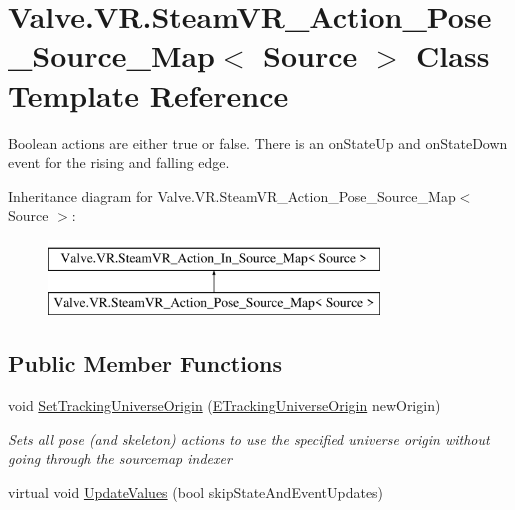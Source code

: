 \hypertarget{class_valve_1_1_v_r_1_1_steam_v_r___action___pose___source___map}{}\section{Valve.\+V\+R.\+Steam\+V\+R\+\_\+\+Action\+\_\+\+Pose\+\_\+\+Source\+\_\+\+Map$<$ Source $>$ Class Template Reference}
\label{class_valve_1_1_v_r_1_1_steam_v_r___action___pose___source___map}


Boolean actions are either true or false. There is an on\+State\+Up and on\+State\+Down event for the rising and falling edge.  


Inheritance diagram for Valve.\+V\+R.\+Steam\+V\+R\+\_\+\+Action\+\_\+\+Pose\+\_\+\+Source\+\_\+\+Map$<$ Source $>$\+:\begin{figure}[H]
\begin{center}
\leavevmode
\includegraphics[height=2.000000cm]{class_valve_1_1_v_r_1_1_steam_v_r___action___pose___source___map}
\end{center}
\end{figure}
\subsection*{Public Member Functions}
\begin{DoxyCompactItemize}
\item 
void \mbox{\hyperlink{class_valve_1_1_v_r_1_1_steam_v_r___action___pose___source___map_ae4ca8d0ab32ff169f5f7d3825a024082}{Set\+Tracking\+Universe\+Origin}} (\mbox{\hyperlink{namespace_valve_1_1_v_r_a29be99a3c2f780157bd490db06a7f12f}{E\+Tracking\+Universe\+Origin}} new\+Origin)
\begin{DoxyCompactList}\small\item\em Sets all pose (and skeleton) actions to use the specified universe origin without going through the sourcemap indexer \end{DoxyCompactList}\item 
virtual void \mbox{\hyperlink{class_valve_1_1_v_r_1_1_steam_v_r___action___pose___source___map_a1a1ff6dfe3a10879dc5b60f702c2d23a}{Update\+Values}} (bool skip\+State\+And\+Event\+Updates)
\end{DoxyCompactItemize}
